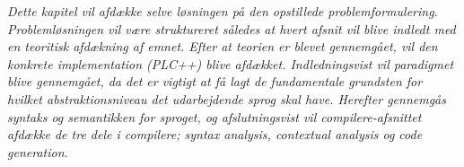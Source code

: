 \textit{Dette kapitel vil afdække selve løsningen på den opstillede problemformulering. Problemløsningen vil være struktureret således at hvert afsnit vil blive indledt med en teoritisk afdækning af emnet. Efter at teorien er blevet gennemgået, vil den konkrete implementation (PLC++) blive afdækket. Indledningsvist vil paradigmet blive gennemgået, da det er vigtigt at få lagt de fundamentale grundsten for hvilket abstraktionsniveau det udarbejdende sprog skal have. Herefter gennemgås syntaks og semantikken for sproget, og afslutningsvist vil compilere-afsnittet afdække de tre dele i compilere; syntax analysis, contextual analysis og code generation.}